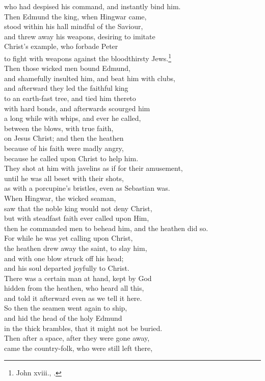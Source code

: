 \documentclass[10pt]{book}
\begin{document}
\begin{center}
\parbox{\pagelen}{
who had despised his command, and instantly bind him. \\
Then Edmund the king, when Hingwar came, \\
stood within his hall mindful of the Saviour, \\
and threw away his weapons, desiring to imitate \\
Christ's example, who forbade Peter \\
to fight with weapons against the bloodthirsty Jews.\footnote[\textdagger]{John xviii., .} \\
Then those wicked men bound Edmund, \\
and shamefully insulted him, and beat him with clubs, \\
and afterward they led the faithful king \\
to an earth-fast tree, and tied him thereto \\
with hard bonds, and afterwards scourged him \\
a long while with whips, and ever he called, \\
between the blows, with true faith, \\
on Jesus Christ; and then the heathen \\
because of his faith were madly angry, \\
because he called upon Christ to help him. \\
They shot at him with javelins as if for their amusement, \\
until he was all beset with their shots, \\
as with a porcupine's bristles, even as Sebastian was. \\
When Hingwar, the wicked seaman, \\
saw that the noble king would not deny Christ, \\
but with steadfast faith ever called upon Him, \\
then he commanded men to behead him, and the heathen did so. \\
For while he was yet calling upon Christ, \\
the heathen drew away the saint, to slay him, \\
and with one blow struck off his head; \\
and his soul departed joyfully to Christ. \\
There was a certain man at hand, kept by God \\
hidden from the heathen, who heard all this, \\
and told it afterward even as we tell it here. \\
So then the seamen went again to ship, \\
and hid the head of the holy Edmund \\
in the thick brambles, that it might not be buried. \\
Then after a space, after they were gone away, \\
came the country-folk, who were still left there, \\
}
\end{center}
\end{document}
